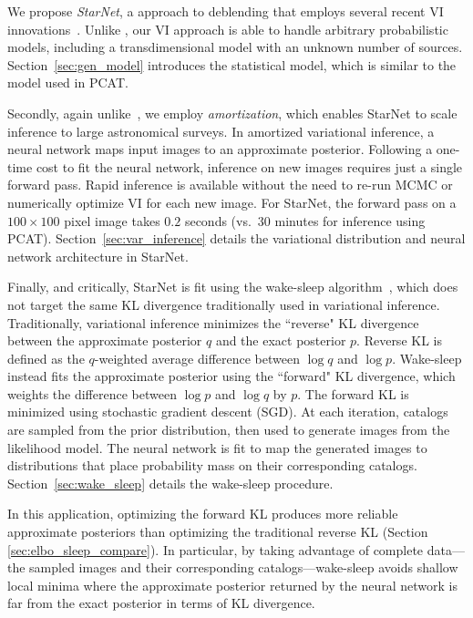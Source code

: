 \nopagebreak[4]

We propose {\itshape StarNet}, a approach to deblending that employs several recent VI innovations~\citep{zhang2019advances,le2020revisiting}.
Unlike \cite{regier2019_celeste}, our VI approach is able to handle arbitrary probabilistic models, including a transdimensional model with an unknown number of sources. Section~\ref{sec:gen_model} introduces the statistical model, which is similar to the model used in PCAT.

Secondly, again unlike~\cite{regier2019_celeste}, 
we employ {\itshape amortization}, which enables StarNet to scale inference to large astronomical surveys. 
In amortized variational inference, a neural network maps input images to an approximate posterior.
Following a one-time cost to fit the neural network, inference 
on new images requires just a single forward pass.
Rapid inference is available without the need to re-run MCMC or numerically optimize VI for each new image. 
For StarNet, the forward pass on 
a $100 \times 100$ pixel image takes $0.2$ seconds (vs.~30 minutes for inference using PCAT).
Section~\ref{sec:var_inference} details the variational distribution and neural network architecture in StarNet. 

Finally, and critically, StarNet is fit using the wake-sleep algorithm~\citep{Hinton1995wake_sleep}, which does not target the same KL divergence traditionally used in  variational inference. Traditionally, variational inference minimizes the ``reverse" KL divergence between the approximate posterior $q$ and the exact posterior $p$.
Reverse KL is defined as the $q$-weighted average difference between $\log q$ and $\log p$. 
Wake-sleep instead fits the approximate posterior using the ``forward" KL divergence, which weights the difference between $\log p$ and $\log q$ by $p$.
The forward KL is minimized using stochastic gradient descent (SGD). 
At each iteration, catalogs are sampled from the prior distribution, then used to generate images from the likelihood model. 
The neural network is fit to map the generated images to distributions that place probability mass on their corresponding catalogs. Section~\ref{sec:wake_sleep} details the wake-sleep procedure. 

In this application, optimizing the forward KL produces more reliable approximate posteriors than optimizing the traditional reverse KL (Section \ref{sec:elbo_sleep_compare}). 
In particular, by taking advantage of complete data---the sampled images and their corresponding catalogs---wake-sleep avoids shallow local minima where the approximate posterior returned by the neural network is far from the exact posterior in terms of KL divergence. 

